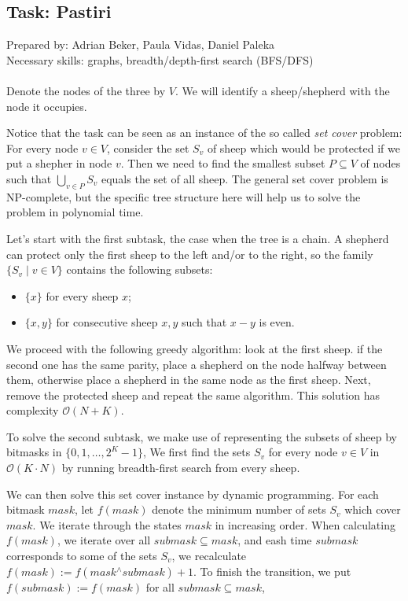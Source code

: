 \subsection*{Task: Pastiri}
\textsf{Prepared by: Adrian Beker, Paula Vidas, Daniel Paleka}\\
\textsf{Necessary skills: graphs, breadth/depth-first search (BFS/DFS)}
\\\\

Denote the nodes of the three by $V$.
We will identify a sheep/shepherd with the node it occupies. 

Notice that the task can be seen as an instance of the so
called \textit{set cover} problem: 
For every node $v \in V$, consider the set $S_v$ of sheep which would be
protected if we put a shepher in node $v$. Then we need to find the smallest subset $P \subseteq V$ of
nodes such that $\bigcup_{v \in P} S_v$ equals the set of all sheep.
The general set cover problem is NP-complete, but the specific tree structure
here will help us to solve the problem in polynomial time.

Let's start with the first subtask, the case when the tree is a chain. A
shepherd can protect only the first sheep to the left and/or to the right, so
the family $\{S_v \mid v \in V\}$ contains the following subsets:
\begin{itemize}
    \item $\{x\}$ for every sheep $x$;
    \item $\{x, y\}$ for consecutive sheep $x, y$ such that $x-y$ is even. 
\end{itemize}
We proceed with the following greedy algorithm: look at the first
sheep. if the second one has the same parity, place a shepherd on the node
halfway between them, otherwise place a shepherd in the same node as the first
sheep. Next, remove the protected sheep and repeat the same algorithm.
This solution has complexity $\mathcal{O}(N + K)$.

To solve the second subtask, we make use of representing 
the subsets of sheep by bitmasks in $\{0, 1, \ldots, 2^K - 1\}$, We first find
the sets $S_v$ for every node $v \in V$ in $\mathcal{O}(K \cdot N)$ 
by running breadth-first search from every sheep.

We can then solve this set cover instance by dynamic programming.
For each bitmask $mask$, let $f(mask)$ denote the minimum number of sets $S_v$
which cover $mask$.
We iterate through the states $mask$ in increasing order. When calculating
$f(mask)$, we iterate over all $submask \subseteq mask$, and eash time $submask$
corresponds to some of the sets $S_v$, we recalculate 
$f(mask) := f(mask \mathbin{^\wedge} submask) + 1$.  
To finish the transition, we put $f(submask) := f(mask)$ 
for all $submask \subseteq mask$, 

